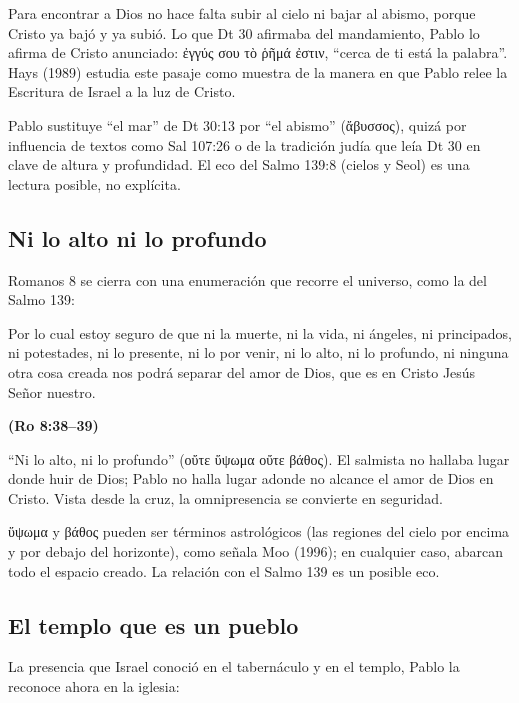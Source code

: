 \documentclass[11pt,letterpaper]{article}
\newcommand{\grc}[1]{\foreignlanguage{ancientgreek}{#1}}
\newcommand{\fuente}[1]{\par\hfill{\upshape\bfseries\small\textcolor{azul}{#1}}}
\begin{document}
Para encontrar a Dios no hace falta subir al cielo ni bajar al abismo, porque Cristo ya bajó y ya subió. Lo que Dt 30 afirmaba del mandamiento, Pablo lo afirma de Cristo anunciado: \grc{ἐγγύς σου τὸ ῥῆμά ἐστιν}, ``cerca de ti está la palabra''. Hays (1989) estudia este pasaje como muestra de la manera en que Pablo relee la Escritura de Israel a la luz de Cristo.

\begin{nota}[Precisión]
Pablo sustituye ``el mar'' de Dt 30:13 por ``el abismo'' (\grc{ἄβυσσος}), quizá por influencia de textos como Sal 107:26 o de la tradición judía que leía Dt 30 en clave de altura y profundidad. El eco del Salmo 139:8 (cielos y Seol) es una lectura posible, no explícita.
\end{nota}

\subsection{Ni lo alto ni lo profundo}

Romanos 8 se cierra con una enumeración que recorre el universo, como la del Salmo 139:

\begin{cita}Por lo cual estoy seguro de que ni la muerte, ni la vida, ni ángeles, ni principados, ni potestades, ni lo presente, ni lo por venir, ni lo alto, ni lo profundo, ni ninguna otra cosa creada nos podrá separar del amor de Dios, que es en Cristo Jesús Señor nuestro.\fuente{(Ro 8:38--39)}\end{cita}

``Ni lo alto, ni lo profundo'' (\grc{οὔτε ὕψωμα οὔτε βάθος}). El salmista no hallaba lugar donde huir de Dios; Pablo no halla lugar adonde no alcance el amor de Dios en Cristo. Vista desde la cruz, la omnipresencia se convierte en seguridad.

\begin{nota}[Precisión]
\grc{ὕψωμα} y \grc{βάθος} pueden ser términos astrológicos (las regiones del cielo por encima y por debajo del horizonte), como señala Moo (1996); en cualquier caso, abarcan todo el espacio creado. La relación con el Salmo 139 es un posible eco.
\end{nota}

\subsection{El templo que es un pueblo}

La presencia que Israel conoció en el tabernáculo y en el templo, Pablo la reconoce ahora en la iglesia:
\end{document}
